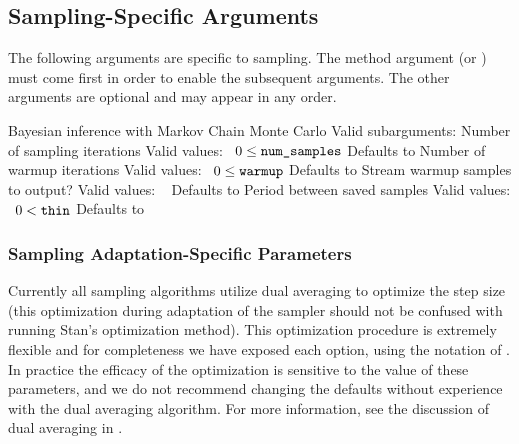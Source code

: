 \subsection{Sampling-Specific Arguments}

The following arguments are specific to sampling.  The method argument
 (or ) must come first in order to
enable the subsequent arguments.  The other arguments are optional and
may appear in any order.

\begin{description}
    {Bayesian inference with Markov Chain Monte Carlo}
    {Valid subarguments: 
      }
%
      {Number of sampling iterations}
      {Valid values: \  $0 \leq \mbox{\code{num\_samples}}$}
      {Defaults to }
%
      {Number of warmup iterations}
      {Valid values: \  $0 \leq \mbox{\code{warmup}}$}
      {Defaults to }
%
      {Stream warmup samples to output?}
      {Valid values: \ }
      {Defaults to }
%
      {Period between saved samples}
      {Valid values: \  $0 < \mbox{\code{thin}}$}
      {Defaults to }
%
\end{description}

\subsubsection{Sampling Adaptation-Specific Parameters}

Currently all \Stan sampling algorithms utilize dual averaging to
optimize the step size (this optimization during adaptation of the
sampler should not be confused with running Stan's optimization method).
This optimization procedure is extremely flexible and for completeness
we have exposed each option, using the notation of
\citep{Hoffman-Gelman:2011, Hoffman-Gelman:2013}.  In practice the
efficacy of the optimization is sensitive to the value of these
parameters, and we do not recommend changing the defaults without
experience with the dual averaging algorithm.  For more information,
see the discussion of dual averaging in \citep{Hoffman-Gelman:2011,
  Hoffman-Gelman:2013}.


